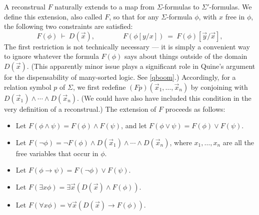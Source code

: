
A reconstrual $F$ naturally extends to a map from $\Sigma$-formulas to
$\Sigma '$-formulas.  We define this extension, also called $F$, so
that for any $\Sigma$-formula $\phi$, with $x$ free in $\phi$, the
following two constraints are satisfied:
\[ F(\phi )\:\vdash \: D(\vec{x}) ,\qquad \qquad F(\phi [y/x]) \: = \:
  F(\phi )[\vec{y}/\vec{x}] , \] The first restriction is not
technically necessary --- it is simply a convenient way to ignore
whatever the formula $F(\phi )$ says about things outside of the
domain $D(\vec{x})$.  (This apparently minor issue plays a significant
role in Quine's argument for the dispensability of many-sorted logic.
See \ref{qboom}.)  Accordingly, for a relation symbol $p$ of $\Sigma$,
we first redefine $(Fp)(\vec{x}_1,\dots ,\vec{x}_n)$ by conjoining
with $D(\vec{x}_1)\wedge\cdots\wedge D(\vec{x}_n)$.  (We could have
also have included this condition in the very definition of a
reconstrual.)  The extension of $F$ proceeds as
follows: \begin{itemize}
\item Let $F(\phi\wedge \psi )=F(\phi )\wedge F(\psi )$, and let
  $F(\phi\vee\psi )=F(\phi )\vee F(\psi )$. 
\item Let
  $F(\neg \phi ) =\neg F(\phi )\wedge D(\vec{x}_1)\wedge\cdots\wedge
  D(\vec{x}_n)$, where $x_1,\dots ,x_n$ are all the free variables
  that occur in $\phi$.
\item Let $F(\phi\to\psi )=F(\neg\phi )\vee F(\psi )$.
\item Let
  $F(\exists x\phi )=\exists \vec{x}(D(\vec{x})\wedge F(\phi ))$.
\item Let $F(\forall x\phi )=\forall \vec{x}(D(\vec{x})\to F(\phi ))$.
\end{itemize}
  
